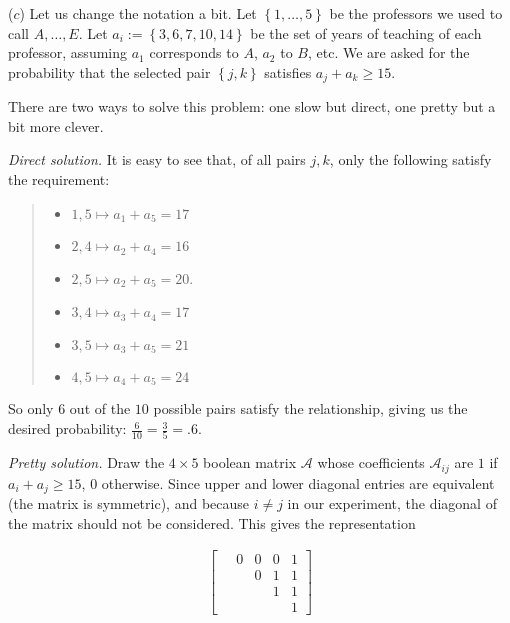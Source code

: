 \documentclass[a4paper, 12pt]{article}
\begin{document}
    ($c$) Let us change the notation a bit. Let $\left\{ 1,\ldots, 5 \right\} $
    be the professors we used to call $A, \ldots, E$. Let $a_i := \left\{ 3, 6,
    7, 10, 14 \right\} $ be the set of years of teaching of each professor,
    assuming $a_1$ corresponds to $A$, $a_2$ to $B$, etc. We are asked for the
    probability that the selected pair $\left\{ j, k \right\} $ satisfies 
    $a_j + a_k \geq 15$.

    There are two ways to solve this problem: one slow but direct, one 
    pretty but a bit more clever.

    \textit{Direct solution.} It is easy to see that, of all pairs $j, k$, only the following 
    satisfy the requirement:

   
   \small
   \begin{quote}
   
   
    \begin{itemize}
        \item $1, 5 \mapsto a_1 + a_5 = 17$ 
        \item $2, 4 \mapsto a_2 + a_4 = 16$
        \item $2, 5 \mapsto  a_2 + a_5 = 20$.
        \item $3, 4 \mapsto a_3 + a_4 = 17$
        \item $3, 5 \mapsto  a_3 + a_5 = 21$
        \item $4, 5 \mapsto a_4+a_5=24$
    \end{itemize}
   
   \end{quote}
   \normalsize
  
   So only $6$ out of the $10$ possible pairs satisfy the relationship, giving us 
   the desired probability: $\frac{6}{10} = \frac{3}{5} = .6$.

   \textit{Pretty solution.} Draw the $4\times 5$ boolean matrix $\mathcal{A}$
   whose coefficients $\mathcal{A}_{ij}$ are $1$ if $a_i + a_j \geq 15$, $0$
   otherwise. Since upper and lower diagonal entries are equivalent (the matrix
   is symmetric), and because $i \neq j$ in our experiment, the diagonal of the
   matrix should not be considered. This gives the representation

   \begin{align*}
   \begin{bmatrix} 
       ~ & 0 & 0 &0 &1 \\ 
       ~&~&0&1&1 \\ 
       ~&~&~&1&1 \\ 
       ~ &~&~&~&1
   \end{bmatrix} 
   \end{align*}
\end{document}
